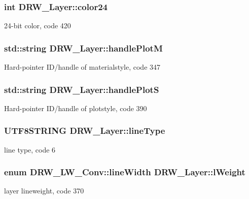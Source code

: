 \subsubsection[{color24}]{\setlength{\rightskip}{0pt plus 5cm}int D\+R\+W\+\_\+\+Layer\+::color24}\label{class_d_r_w___layer_a20e31ea14b3aff0194d862f06299fc98}
24-\/bit color, code 420 \hypertarget{class_d_r_w___layer_a67df26a8d8edf1cc26f62e3634c511ec}{}
\subsubsection[{handle\+Plot\+M}]{\setlength{\rightskip}{0pt plus 5cm}std\+::string D\+R\+W\+\_\+\+Layer\+::handle\+Plot\+M}\label{class_d_r_w___layer_a67df26a8d8edf1cc26f62e3634c511ec}
Hard-\/pointer I\+D/handle of materialstyle, code 347 \hypertarget{class_d_r_w___layer_ab158e3921f753cd59d6121f712062b9d}{}
\subsubsection[{handle\+Plot\+S}]{\setlength{\rightskip}{0pt plus 5cm}std\+::string D\+R\+W\+\_\+\+Layer\+::handle\+Plot\+S}\label{class_d_r_w___layer_ab158e3921f753cd59d6121f712062b9d}
Hard-\/pointer I\+D/handle of plotstyle, code 390 \hypertarget{class_d_r_w___layer_a269aec5f78373fe152d83c39eca08ed0}{}
\subsubsection[{line\+Type}]{\setlength{\rightskip}{0pt plus 5cm}U\+T\+F8\+S\+T\+R\+I\+N\+G D\+R\+W\+\_\+\+Layer\+::line\+Type}\label{class_d_r_w___layer_a269aec5f78373fe152d83c39eca08ed0}
line type, code 6 \hypertarget{class_d_r_w___layer_a55dca2dbf071c0350a8b2aa3d9c5bfbd}{}
\subsubsection[{l\+Weight}]{\setlength{\rightskip}{0pt plus 5cm}enum {\bf D\+R\+W\+\_\+\+L\+W\+\_\+\+Conv\+::line\+Width} D\+R\+W\+\_\+\+Layer\+::l\+Weight}\label{class_d_r_w___layer_a55dca2dbf071c0350a8b2aa3d9c5bfbd}
layer lineweight, code 370 \hypertarget{class_d_r_w___layer_ac385c41055cb96d3c0ccb2938cb198f9}{}
